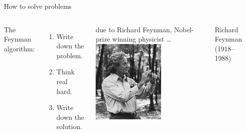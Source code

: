\documentclass[aspectratio=169,usenames,dvipsnames]{beamer}
\begin{document}
\begin{frame}{How to solve problems}
    \begin{columns}
            The Feynman algorithm:
            \begin{enumerate}
                \item Write down the problem.
                \item Think real hard.
                \item Write down the solution.
            \end{enumerate}

            \vspace{1em}
            due to Richard Feynman, Nobel-prize winning physicist \dots
        \centering
            \includegraphics[width=0.6\textwidth]{fig/feynman}

            \vspace{1em} Richard Feynman (1918--1988)
    \end{columns}
\end{frame}
\end{document}
